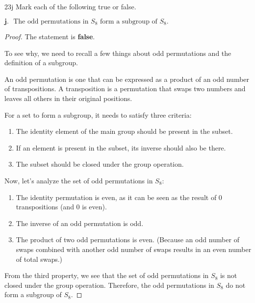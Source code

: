 \documentclass[12pt]{amsart}
\theoremstyle{definition}
\numberwithin{equation}{section}
\theoremstyle{plain}
\begin{document}
\begin{exercise}{23j} Mark each of the following true or false.

    \(\textbf{j. } \text{ The odd permutations in $S_8$ form a subgroup of $S_8$.}\)

    \begin{proof}
        The statement is \textbf{false}.
        
        To see why, we need to recall a few things about odd permutations and the definition of a subgroup.
        
        An odd permutation is one that can be expressed as a product of an odd number of transpositions. A transposition is a permutation that swaps two numbers and leaves all others in their original positions.
        
        For a set to form a subgroup, it needs to satisfy three criteria:
        \begin{enumerate}
            \item The identity element of the main group should be present in the subset.
            \item If an element is present in the subset, its inverse should also be there.
            \item The subset should be closed under the group operation.
        \end{enumerate}
        
        Now, let's analyze the set of odd permutations in \( S_8 \):
        \begin{enumerate}
            \item The identity permutation is even, as it can be seen as the result of 0 transpositions (and 0 is even).
            \item The inverse of an odd permutation is odd.
            \item The product of two odd permutations is even. (Because an odd number of swaps combined with another odd number of swaps results in an even number of total swaps.)
        \end{enumerate}
        
        From the third property, we see that the set of odd permutations in \( S_8 \) is not closed under the group operation. Therefore, the odd permutations in \( S_8 \) do not form a subgroup of \( S_8 \).
        \end{proof}
\end{exercise}
\vspace*{20pt}
\end{document}
